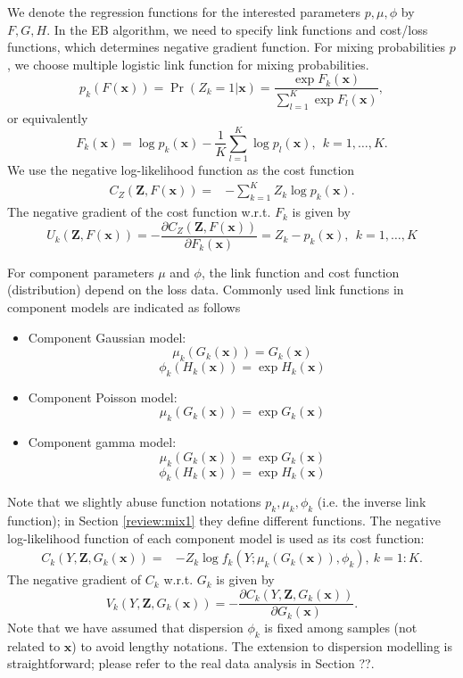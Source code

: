 \documentclass[11pt]{article}
\numberwithin{equation}{section}
\def\bx{\boldsymbol{x}}
\def\bZ{\boldsymbol{Z}}
\begin{document}
We denote the regression functions for the interested parameters $p,\mu,\phi$ by {$F,G,H$}. In the EB algorithm, we need to specify link functions and cost/loss functions, which determines negative gradient function.
For mixing probabilities $p$, we choose multiple logistic link function for mixing probabilities.	
	\begin{equation}\label{logistic}
		p_k(F(\bx))=\Pr(Z_k=1|\bx)=\frac{\exp{F_k(\bx)}}{\sum_{l=1}^{K}\exp{F_l(\bx)}},
	\end{equation}
	or equivalently
	\begin{equation}\label{inv-logistic}
		F_k(\bx)=\log p_k(\bx)-\frac{1}{K}\sum_{l=1}^K\log p_l(\bx),~~k=1,\ldots,K.
	\end{equation}
We use the negative log-likelihood function as the cost function
\begin{equation}
	\begin{aligned}
		{C_{Z}(\bZ, F(\bx))}=& - \sum_{k=1}^K Z_k \log p_k(\bx).
	\end{aligned}
\end{equation}
The negative gradient of the cost function w.r.t. $F_k$ is given by
\begin{equation}
	{U_k(\bZ,F(\bx))}=-\frac{\partial C_{Z}(\bZ,F(\bx))}{\partial F_k(\bx)}=
	Z_k-p_k(\bx), ~~k=1,\ldots,K
\end{equation}

For component parameters $\mu$ and $\phi$, the link function and cost function (distribution) depend on the loss data.
Commonly used link functions in component models are indicated as follows
	\begin{itemize}
		\item Component Gaussian model:
		$$\mu_k(G_k(\bx))=G_k(\bx)$$
		$$\phi_k(H_k(\bx))=\exp H_k(\bx)$$
		\item Component Poisson model:
		$$\mu_k(G_k(\bx))=\exp G_k(\bx)$$
		\item Component gamma model:
		$$\mu_k(G_k(\bx))=\exp G_k(\bx)$$
		$$\phi_k(H_k(\bx))=\exp H_k(\bx)$$
	\end{itemize}
Note that we slightly abuse function notations $p_k,\mu_k,\phi_k$ (i.e. the inverse link function); in Section \eqref{review:mix1} they define different functions.
The negative log-likelihood function of each component model is used as its cost function:
	\begin{equation}
		\begin{aligned}
			{C_k(Y,\bZ,G_k(\bx))}=& -Z_k\log f_k(Y;\mu_k(G_k(\bx)),\phi_k), ~ k=1:K.
		\end{aligned}
	\end{equation}
	The negative gradient of $C_k$ w.r.t. $G_k$ is given by 
	$${V_k(Y,\bZ,G_k(\bx))}=-\frac{\partial C_k(Y,\bZ,G_k(\bx))}{\partial G_k(\bx)}.$$
	Note that we have assumed that dispersion $\phi_k$ is fixed among samples (not related to $\bx$) to avoid lengthy notations. The extension to dispersion modelling is straightforward; please refer to the real data analysis in Section ??.
\end{document}
